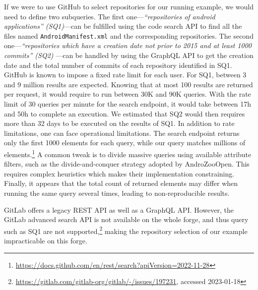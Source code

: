 If we were to use GitHub to select repositories for our running example, we would need to define two subqueries.
The first one---\emph{``repositories of android applications'' (SQ1)}---can be fulfilled using the code search API to find all the files named \texttt{AndroidManifest.xml} and the corresponding repositories.
The second one---\emph{``repositories which have a creation date not prior to 2015 and at least 1000 commits'' (SQ2) }---can be handled by using the GraphQL API to get the creation date and the total number of commits of each repository identified in SQ1.
GitHub is known to impose a fixed rate limit for each user.
For SQ1, between \num{3} and \num{9} million results are expected. Knowing that at most \num{100} results are returned per request, it would require to run between 30K and 90K queries. With the rate limit of 30 queries per minute for the search endpoint, it would take between 17h and 50h to complete an execution.
We estimated that SQ2 would then requires more than \num{32} days to be executed on the results of SQ1.
In addition to rate limitations, one can face operational limitations. The search endpoint returns only the first \num{1000} elements for each query, while our query matches millions of elements.\footnote{\url{https://docs.github.com/en/rest/search?apiVersion=2022-11-28}}
A common tweak is to divide massive queries using available attribute filters, such as the divide-and-conquer strategy adopted by AndroZooOpen.
This requires complex heuristics which makes their implementation  constraining. 
Finally, it appears that the total count of returned elements may differ when running the same query several times, leading to non-reproducible results. 

GitLab offers a legacy REST API as well as a GraphQL API.
However, the GitLab advanced search API 
is not available on the whole forge, and thus query such as SQ1 are not supported,\footnote{\url{https://gitlab.com/gitlab-org/gitlab/-/issues/197231}, accessed 2023-01-18} making the repository selection of our example impracticable on this forge.

